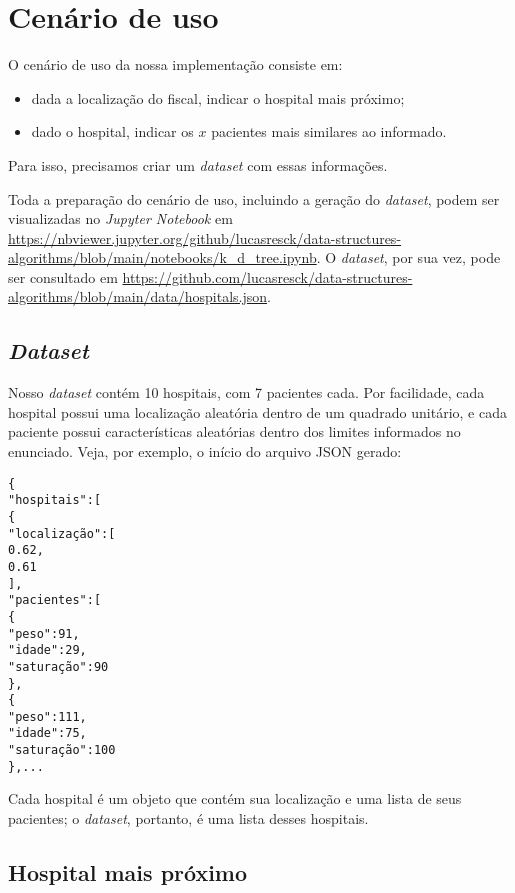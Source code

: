 \section{Cenário de uso}
    \label{sec:usage_scenario}

    O cenário de uso da nossa implementação consiste em:
    \begin{itemize}
        \item dada a localização do fiscal, indicar o hospital mais próximo;
        \item dado o hospital, indicar os $x$ pacientes mais similares ao informado.
    \end{itemize}
    Para isso, precisamos criar um \textit{dataset} com essas informações.

    Toda a preparação do cenário de uso, incluindo a geração do \textit{dataset}, podem ser visualizadas no \textit{Jupyter Notebook} em \url{https://nbviewer.jupyter.org/github/lucasresck/data-structures-algorithms/blob/main/notebooks/k_d_tree.ipynb}. O \textit{dataset}, por sua vez, pode ser consultado em \url{https://github.com/lucasresck/data-structures-algorithms/blob/main/data/hospitals.json}.

    \subsection{\textit{Dataset}}

        Nosso \textit{dataset} contém 10 hospitais, com 7 pacientes cada. Por facilidade, cada hospital possui uma localização aleatória dentro de um quadrado unitário, e cada paciente possui características aleatórias dentro dos limites informados no enunciado.
        Veja, por exemplo, o início do arquivo JSON gerado:
        \begin{alltt}
\{
    "hospitais": [
        \{
            "localização": [
                0.62,
                0.61
            ],
            "pacientes": [
                \{
                    "peso": 91,
                    "idade": 29,
                    "saturação": 90
                \},
                \{
                    "peso": 111,
                    "idade": 75,
                    "saturação": 100
                \}, ...
        \end{alltt}
        Cada hospital é um objeto que contém sua localização e uma lista de seus pacientes; o \textit{dataset}, portanto, é uma lista desses hospitais.

    \subsection{Hospital mais próximo}

